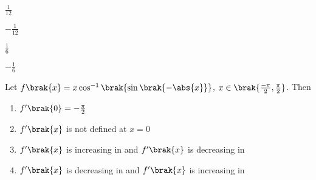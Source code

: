 \hfill{}
\begin{enumerate}
\begin{multicols}{4}
\item $\frac{1}{12}$
\item $-\frac{1}{12}$
\item $\frac{1}{6}$
\item $-\frac{1}{6}$
\end{multicols}
\end{enumerate}

\item Let $f\brak{x} = x\cos^{-1}\brak{\sin\brak{-\abs{x}}}$, $x \in \brak{\frac{-\pi}{2},\frac{\pi}{2}}$. Then

\hfill{}
\begin{enumerate}
\item $f^\prime\brak{0}=-\frac{\pi}{2}$
\item $f^\prime\brak{x}$ is not defined at $x=0$
\item $f^\prime\brak{x}$ is increasing in  and $f^\prime\brak{x}$ is decreasing in 
\item $f^\prime\brak{x}$ is decreasing in  and $f^\prime\brak{x}$ is increasing in 
\end{enumerate}
